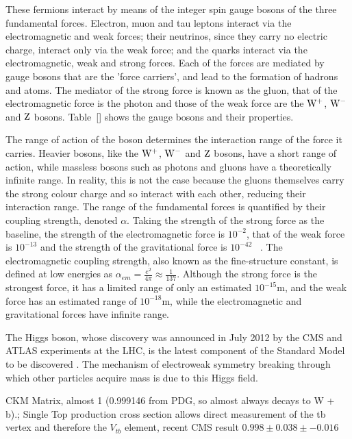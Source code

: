 These fermions interact by means of the integer spin gauge bosons of the three fundamental forces. Electron,
muon and tau leptons interact via the electromagnetic and weak forces; their neutrinos, since they carry no electric
charge, interact only via the weak force; and the quarks interact via the electromagnetic, weak and strong
forces. Each of the forces are mediated by gauge bosons that are the 'force carriers', and lead to the
formation of hadrons and atoms. The mediator of the strong force is known as the gluon, that of the
electromagnetic force is the photon and those of the weak force are the $\mathrm{W}^{+}$, $\mathrm{W}^{-}$ and $\mathrm{Z}$ bosons.
Table~\ref{} shows the gauge bosons and their properties.

The range of action of the boson determines the interaction range of the force it carries. Heavier bosons,
like the $\mathrm{W}^{+}$, $\mathrm{W}^{-}$ and $\mathrm{Z}$ bosons, have a short range of action, while massless bosons such as
photons and gluons have a theoretically infinite range. In reality, this is not the case because the gluons
themselves carry the strong colour charge and so interact with each other, reducing their interaction range.
The range of the  fundamental forces is quantified by their coupling strength, denoted $\alpha$. Taking the
strength of the strong force as the baseline, the strength of the electromagnetic force is $10^{-2}$, that of
the weak force is $10^{-13}$ and the strength of the gravitational force is $10^{-42}$
~\cite{Griffiths:1987tj}.
The electromagnetic coupling strength, also known as the fine-structure constant, is defined at low energies
as $\alpha_{em} = \frac{e^{2}}{4\pi}\approx \frac{1}{137}$. Although the strong force is the strongest force,
it has a limited range of only an estimated $10^{-15}$m, and the weak force has an estimated range of
$10^{-18}$m, while the electromagnetic and gravitational forces have infinite range.

The Higgs boson, whose discovery was announced in July 2012 by the CMS and ATLAS experiments at the LHC, is
the latest component of the Standard Model to be discovered \cite{Chatrchyan:2012xdj, Aad:2012tfa}. The
mechanism of electroweak symmetry breaking through which other particles acquire mass is due to this Higgs
field.

CKM Matrix,  almost 1 (0.999146 from PDG, so almost always decays to W + b).; Single Top
production cross section allows direct measurement of the tb vertex and therefore the $V_{tb}$ element,
recent CMS result $0.998\pm0.038\pm-0.016$

